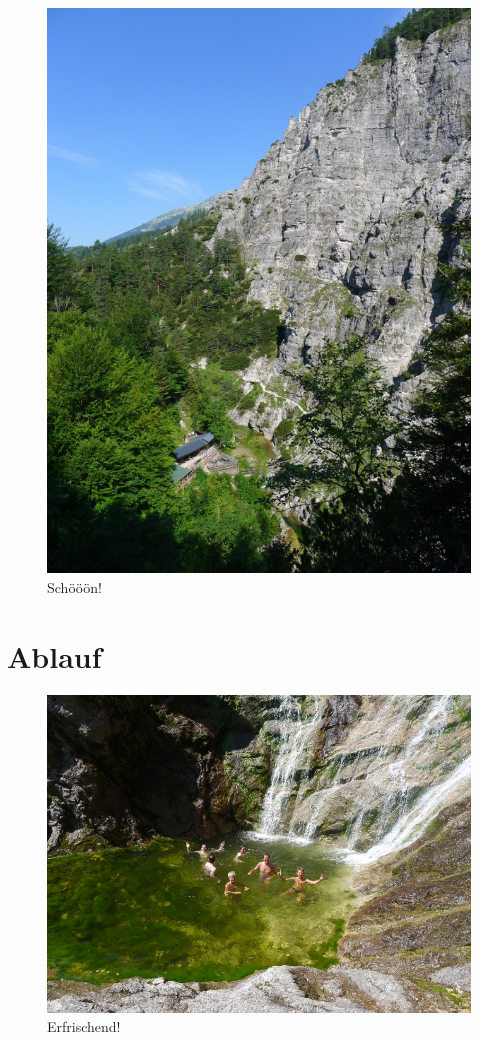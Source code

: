 \documentclass[twoside]{article}
\begin{document}
\begin{multicols}{2}
\begin{figure}[H]
\begin{center}
  \includegraphics[trim = 0 15 0 0, clip, natwidth=600, natheight=800, width=.45\textwidth]{Figures/oetschergraeben.jpg}
\end{center}
\caption{Schööön!}
\label{fig:oetschergraeben}
\end{figure}


\section{Ablauf}

\begin{figure}
\begin{center}
  \includegraphics[trim = 0 80 0 80, clip, natwidth=800, natheight=600, width=\textwidth]{Figures/bad.jpg}
\end{center}
\caption{Erfrischend!}
\label{fig:bad}
\end{figure}


\end{multicols}
\end{document}
